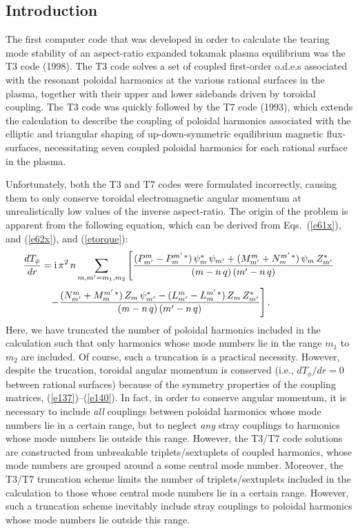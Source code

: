 \documentclass[12pt,prb,aps]{revtex4-1}
\begin{document}
\subsection{Introduction}
The first computer code that was developed in order to calculate the tearing mode stability of an aspect-ratio expanded tokamak plasma equilibrium was the
  T3 code (1998). The T3 code solves a set of coupled first-order o.d.e.s associated with  the resonant poloidal harmonics at the various rational surfaces in the plasma, together with their upper and lower sidebands driven by toroidal coupling.\cite{connor} The T3 code was quickly followed by the T7  code (1993), which extends the calculation to describe the coupling of
  poloidal harmonics associated with the elliptic and triangular shaping of up-down-symmetric equilibrium magnetic flux-surfaces, necessitating  seven coupled poloidal harmonics for each rational surface in the plasma.\cite{am1} 
  
  Unfortunately, both the T3 and T7 codes were formulated incorrectly, causing them to only conserve
  toroidal electromagnetic angular momentum at unrealistically low values of the inverse aspect-ratio. The origin of the problem is apparent from
  the following equation, which can be derived from Eqs.~(\ref{e61x}), and (\ref{e62x}), and (\ref{etorque}):
  \begin{align}
  \frac{dT_\phi}{dr}&= {\rm i}\,\pi^2\,n \sum_{m,m'=m_1,m_2}\left[
 \frac{ (P_{m'}^m-P_m^{m'\,\ast})\,\psi_{m}^\ast\,\psi_{m'}+(M_{m'}^m+N_m^{m'\,\ast})\,\psi_{m}\,Z_{m'}^\ast}{(m-n\,q)\,(m'-n\,q)}\right.\\[0.5ex]
 &\phantom{=} \left.-\frac{(N_{m'}^m+M_m^{m'\,\ast})\,Z_{m}\,\psi_{m'}^\ast-(L_{m'}^m-L_m^{m'\,\ast})\,Z_{m}\,Z_{m'}^\ast}{(m-n\,q)\,(m'-n\,q)}\right].
  \end{align}
  Here, we have truncated the number of poloidal harmonics included in the calculation such that only
  harmonics whose mode numbers lie in the range $m_1$ to $m_2$ are included. Of course, such a truncation is a practical necessity.  However, despite the trucation, toroidal angular
  momentum is conserved (i.e., $dT_\phi/dr=0$ between rational surfaces) because of the symmetry properties of the coupling matrices, (\ref{e137})--(\ref{e140}).  In fact, in order to conserve angular momentum, it is necessary to include {\em all}\/ couplings between poloidal harmonics whose mode numbers lie
  in a certain range, but to neglect {\em any}\/ stray couplings to harmonics whose mode numbers lie outside this range. However, the T3/T7 code solutions are constructed
  from unbreakable triplets/sextuplets  of coupled harmonics, whose mode numbers are grouped around a some central mode number. Moreover, the T3/T7 truncation
  scheme limits the number of triplets/sextuplets included in the calculation to those whose central mode numbers
  lie in a certain range. However, such a truncation scheme inevitably include stray couplings to poloidal harmonics whose mode
  numbers lie outside this range. 
   
\end{document}
